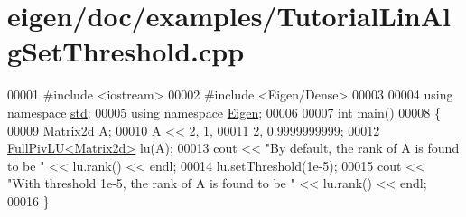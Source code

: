 \hypertarget{eigen_2doc_2examples_2_tutorial_lin_alg_set_threshold_8cpp_source}{}\section{eigen/doc/examples/\+Tutorial\+Lin\+Alg\+Set\+Threshold.cpp}
\label{eigen_2doc_2examples_2_tutorial_lin_alg_set_threshold_8cpp_source}

\begin{DoxyCode}
00001 \textcolor{preprocessor}{#include <iostream>}
00002 \textcolor{preprocessor}{#include <Eigen/Dense>}
00003 
00004 \textcolor{keyword}{using namespace }\hyperlink{namespacestd}{std};
00005 \textcolor{keyword}{using namespace }\hyperlink{namespace_eigen}{Eigen};
00006 
00007 \textcolor{keywordtype}{int} main()
00008 \{
00009    Matrix2d \hyperlink{group___core___module_class_eigen_1_1_matrix}{A};
00010    A << 2, 1,
00011         2, 0.9999999999;
00012    \hyperlink{group___l_u___module_class_eigen_1_1_full_piv_l_u}{FullPivLU<Matrix2d>} lu(A);
00013    cout << \textcolor{stringliteral}{"By default, the rank of A is found to be "} << lu.rank() << endl;
00014    lu.setThreshold(1e-5);
00015    cout << \textcolor{stringliteral}{"With threshold 1e-5, the rank of A is found to be "} << lu.rank() << endl;
00016 \}
\end{DoxyCode}
